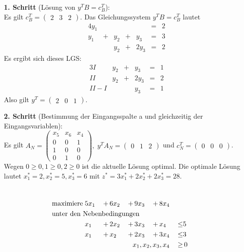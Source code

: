 \documentclass[10pt,a4paper,oneside,ngerman,numbers=noenddot]{scrartcl}
\begin{document}
		\textbf{1. Schritt} (Lösung von $y^{T}B = c_{B}^{T}$):\\
		Es gilt $c_{B}^{T} = \begin{pmatrix} 2 & 3 & 2 \end{pmatrix}$. Das Gleichungssystem $y^{T}B = c_{B}^{T}$ lautet
		\begin{alignat*}{4}
			y_{1} && && &=& 2 \\
			y_{1} &+& y_{2} &+& y_{3} &=& 3 \\
			&& y_{2} &+& 2y_{3} &=& 2
		\end{alignat*}
		Es ergibt sich dieses LGS:
		\begin{alignat*}{3}
			I & y_{2} &+& y_{3} &=& 1 \\
			II & y_{2} &+& 2y_{3} &=& 2 \\
			II - I & && y_{3} &=& 1
		\end{alignat*}
		Also gilt $y^{T} = \begin{pmatrix} 2 & 0 & 1 \end{pmatrix}$.
		
		\textbf{2. Schritt} (Bestimmung der Eingangsspalte a und gleichzeitig der Eingangsvariablen):\\
		Es gilt $A_{N} = \begin{pmatrix} x_{5} & x_{6} & x_{4} \\ 0 & 0 & 1 \\ 1 & 0 & 0 \\ 0 & 1 & 0 \end{pmatrix},\; y^{T}A_{N} = \begin{pmatrix} 0 & 1 & 2 \end{pmatrix}$ und $c_{N}^{T} = \begin{pmatrix} 0 & 0 & 0\end{pmatrix}$. Wegen $0 \geq 0, 1 \geq 0, 2 \geq 0$ ist die aktuelle Lösung optimal. Die optimale Lösung lautet $x_{1}^{*} = 2, x_{2}^{*} = 5, x_{3}^{*} = 6$ mit $z^{*} = 3x_{1}^{*} + 2x_{2}^{*} + 2x_{3}^{*} = 28$.
\section{} %
		\begin{alignat*}{5}
			\text{maximiere}\; & 5x_{1} \,&+&\, 6x_{2} \,&+&\, 9x_{3} \,&+&\, 8x_{4} && \\
			\multicolumn{10}{l}{\text{unter den Nebenbedingungen}} && \\
			\;& x_{1} \,&+&\, 2x_{2} \,&+&\, 3x_{3} \,&+&\, x_{4} \,&\leq & 5 \\
			\;& x_{1} \,&+&\, x_{2} \,&+&\, 2x_{3} \,&+&\, 3x_{4} \,&\leq & 3 \\		
			\multicolumn{8}{r}{$x_{1}, x_{2}, x_{3}, x_{4}$} \,&\geq &\, 0
		\end{alignat*}
		
\end{document}
